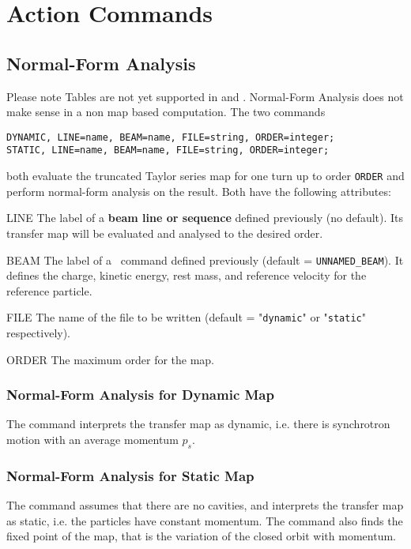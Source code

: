 
%
%

\chapter{Action Commands}
\label{chp:action}

\section{Normal-Form Analysis}
Please note Tables are not yet supported in \noopalt and \noopalcycl. Normal-Form Analysis does not make sense in a non map based computation.
The two commands
\begin{verbatim}
DYNAMIC, LINE=name, BEAM=name, FILE=string, ORDER=integer;
STATIC, LINE=name, BEAM=name, FILE=string, ORDER=integer;
\end{verbatim}
both evaluate the truncated Taylor series map for one turn up to order
\texttt{ORDER} and perform normal-form analysis on the result.
Both have the following attributes:
\begin{kdescription}
\item[LINE]
The label of a \textbf{beam line or sequence}  defined
previously (no default).  Its transfer map will be evaluated and
analysed to the desired order.
\item[BEAM]
The label of a ~command  defined
previously (default = \texttt{UNNAMED\_BEAM}).
It defines the charge, kinetic energy, rest mass,
and reference velocity for the reference
particle.
\item[FILE]
The name of the file to be written
(default = "\texttt{dynamic}" or "\texttt{static}" respectively).
\item[ORDER]
The maximum order for the map.
\end{kdescription}

\subsection{Normal-Form Analysis for Dynamic Map}
\label{sec:dynamic}
The  command interprets the transfer map as dynamic,
i.e. there is synchrotron motion with an average momentum $p_s$.

\subsection{Normal-Form Analysis for Static Map}
\label{sec:static}
The command assumes that there are no cavities,
and interprets the transfer map as static,
i.e. the particles have constant momentum.
The  command also finds the fixed point of the map,
that is the variation of the closed orbit with momentum.
